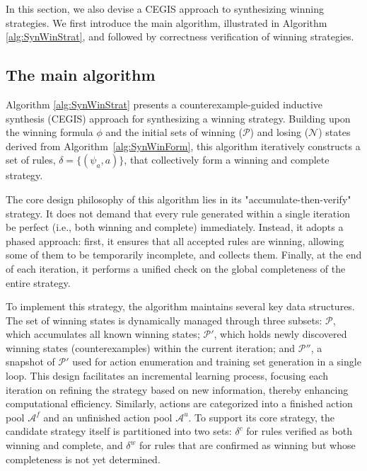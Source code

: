 \documentclass[review]{elsarticle}
\newcommand{\set}[1]{\{ #1 \}}
\newcommand{\positiveSet}{\mathcal{P}}
\newcommand{\negativeSet}{\mathcal{N}}
\newcommand{\act}{\mathcal{A}}
\begin{document}
In this section, we also devise a CEGIS approach to synthesizing winning strategies.
We first introduce the main algorithm, illustrated in Algorithm \ref{alg:SynWinStrat}, and followed by correctness verification of winning strategies.


\subsection{The main algorithm}
Algorithm \ref{alg:SynWinStrat} presents a counterexample-guided inductive synthesis (CEGIS) approach for synthesizing a winning strategy.
Building upon the winning formula $\phi$ and the initial sets of winning ($\positiveSet$) and losing ($\negativeSet$) states derived from Algorithm~\ref{alg:SynWinForm}, 
this algorithm iteratively constructs a set of rules, $\delta = \set{(\psi_a, a)}$, that collectively form a winning and complete strategy.

The core design philosophy of this algorithm lies in its "accumulate-then-verify" strategy. 
It does not demand that every rule generated within a single iteration be perfect (i.e., both winning and complete) immediately. 
Instead, it adopts a phased approach: first, it ensures that all accepted rules are winning, allowing some of them to be temporarily incomplete, and collects them. 
Finally, at the end of each iteration, it performs a unified check on the global completeness of the entire strategy.

To implement this strategy, the algorithm maintains several key data structures. 
The set of winning states is dynamically managed through three subsets: $\positiveSet$, which accumulates all known winning states; 
$\positiveSet'$, which holds newly discovered winning states (counterexamples) within the current iteration; 
and $\positiveSet''$, a snapshot of $\positiveSet'$ used for action enumeration and training set generation in a single loop. 
This design facilitates an incremental learning process, focusing each iteration on refining the strategy based on new information, thereby enhancing computational efficiency. 
Similarly, actions are categorized into a finished action pool $\act^f$ and an unfinished action pool $\act^u$. 
To support its core strategy, the candidate strategy itself is partitioned into two sets: 
$\delta^c$ for rules verified as both winning and complete, and $\delta^w$ for rules that are confirmed as winning but whose completeness is not yet determined.
\end{document}
